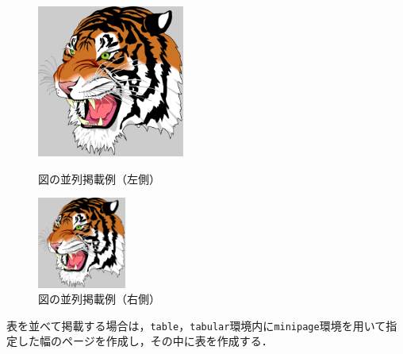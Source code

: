 \documentclass[a4j,11pt]{ujreport}
\begin{document}
\begin{figure}[ht]
	\centering
	\begin{minipage}[b]{0.5\hsize}
		\centering
		\includegraphics[clip,height=5.0cm]{fig/tiger.eps}
		\caption{図の並列掲載例（左側）}
		\label{fig:ExampleParallelFigureLeft}
	\end{minipage}%
	\begin{minipage}[b]{0.5\hsize}
		\centering
		\includegraphics[clip,height=3.0cm]{fig/tiger.eps}
		\caption{図の並列掲載例（右側）}
		\label{fig:ExampleParallelFigureRight}
	\end{minipage}
\end{figure}

表を並べて掲載する場合は，\texttt{table}，\texttt{tabular}環境内に\texttt{minipage}環境を用いて指定した幅のページを作成し，その中に表を作成する．

%
\end{document}
